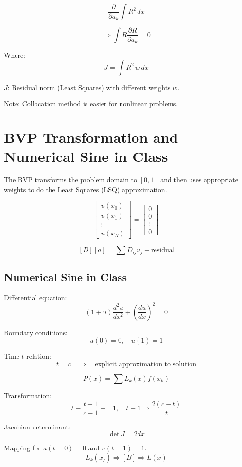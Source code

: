 \documentclass[12pt]{report} %
\begin{document}
\[
\frac{\partial}{\partial a_k} \int R^2 \, dx
\]

\[
\Rightarrow \int R \frac{\partial R}{\partial a_k} = 0
\]

Where:
\[
J = \int R^2 \, w \, dx
\]

\( J \): Residual norm (Least Squares) with different weights \( w \).

\smallskip

Note: Collocation method is easier for nonlinear problems.

\section*{BVP Transformation and Numerical Sine in Class}

The BVP transforms the problem domain to \( [0, 1] \) and then uses appropriate weights to do the Least Squares (LSQ) approximation.

\[
\begin{bmatrix}
    u(x_0) \\
    u(x_1) \\
    \vdots \\
    u(x_N)
\end{bmatrix}
=
\begin{bmatrix}
    0 \\
    0 \\
    \vdots \\
    0
\end{bmatrix}
\]

\[
[D][a] = \sum D_{ij} u_j - \text{residual}
\]

\subsection*{Numerical Sine in Class}

Differential equation:
\[
(1 + u) \frac{d^2 u}{dx^2} + \left( \frac{du}{dx} \right)^2 = 0
\]

Boundary conditions:
\[
u(0) = 0, \quad u(1) = 1
\]

Time \( t \) relation:
\[
t = c \quad \Rightarrow \quad \text{explicit approximation to solution}
\]

\[
P(x) = \sum L_k(x) f(x_k)
\]

Transformation:
\[
t = \frac{t - 1}{c - 1} = -1, \quad t = 1 \rightarrow \frac{2(c - t)}{t}
\]

Jacobian determinant:
\[
\det J = 2dx
\]

Mapping for \( u(t = 0) = 0 \) and \( u(t = 1) = 1 \):
\[
L_k(x_j) \Rightarrow [B] \Rightarrow L(x)
\]
\end{document}
